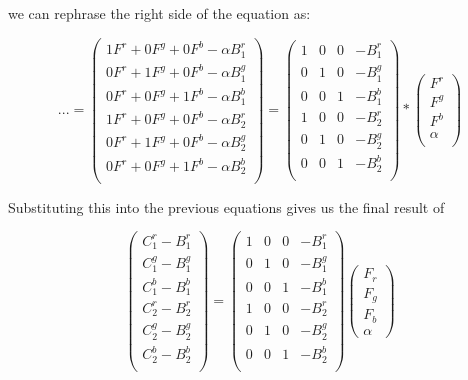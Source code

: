 \documentclass[11pt]{article}
\begin{document}
\begin{center}
we can rephrase the right side of the equation as:

$$
...
=
\begin{pmatrix}
  1 F^{r} + 0 F^{g} + 0 F^{b} - \alpha B^{r}_1\\
  0 F^{r} + 1 F^{g} + 0 F^{b} - \alpha B^{g}_1\\
  0 F^{r} + 0 F^{g} + 1 F^{b} - \alpha B^{b}_1\\
  1 F^{r} + 0 F^{g} + 0 F^{b} - \alpha B^{r}_2\\
  0 F^{r} + 1 F^{g} + 0 F^{b} - \alpha B^{g}_2\\
  0 F^{r} + 0 F^{g} + 1 F^{b} - \alpha B^{b}_2\\
\end{pmatrix}
=
\begin{pmatrix}
  1 & 0 & 0 & - B^{r}_1 \\
  0 & 1 & 0 & - B^{g}_1 \\
  0 & 0 & 1 & - B^{b}_1 \\
  1 & 0 & 0 & - B^{r}_2 \\
  0 & 1 & 0 & - B^{g}_2 \\
  0 & 0 & 1 & - B^{b}_2 \\
\end{pmatrix}
*
\begin{pmatrix}
	F^{r} \\
	F^{g} \\
	F^{b} \\
	\alpha \\
\end{pmatrix}
$$

Substituting this into the previous equations gives us the final result of

$$
\begin{pmatrix}
  C^{r}_1  -B^{r}_1 \\
  C^{g}_1 -B^{g}_1 \\
  C^{b}_1 -B^{b}_1 \\
  C^{r}_2 -B^{r}_2 \\
  C^{g}_2-B^{g}_2 \\
  C^{b}_2-B^{b}_2 \\
\end{pmatrix}=\begin{pmatrix}
1 & 	0 & 	0 & -B^{r}_1 \\
0 & 	1 & 	0 & -B^{g}_1 \\
0 & 	0 & 	1 & -B^{b}_1 \\
1 & 	0 & 	0 & -B^{r}_2 \\
0 & 	1 & 	0 & -B^{g}_2 \\
0 & 	0 & 	1 & -B^{b}_2 \\
\end{pmatrix} 
\begin{pmatrix}
F_r \\
F_g \\
F_b \\
\alpha
\end{pmatrix}
$$
\end{center}
\end{document}
